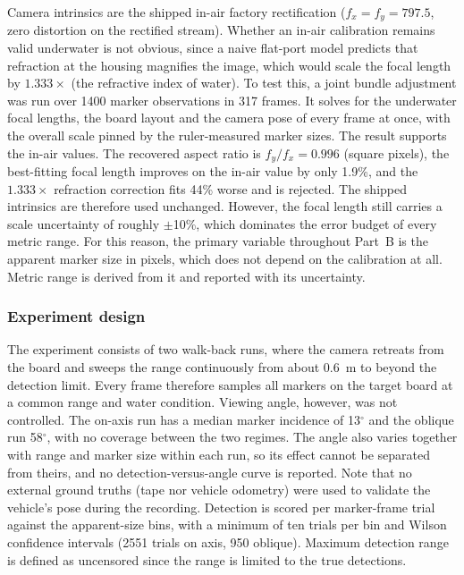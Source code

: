 Camera intrinsics are the shipped in-air factory rectification ($f_x{=}f_y{=}797.5$, zero distortion on the rectified stream). Whether an in-air calibration remains valid underwater is not obvious, since a naive flat-port model predicts that refraction at the housing magnifies the image, which would scale the focal length by $1.333\times$ (the refractive index of water). To test this, a joint bundle adjustment was run over 1400 marker observations in 317 frames. It solves for the underwater focal lengths, the board layout and the camera pose of every frame at once, with the overall scale pinned by the ruler-measured marker sizes. The result supports the in-air values. The recovered aspect ratio is $f_y/f_x = 0.996$ (square pixels), the best-fitting focal length improves on the in-air value by only 1.9\%, and the $1.333\times$ refraction correction fits 44\% worse and is rejected. The shipped intrinsics are therefore used unchanged. However, the focal length still carries a scale uncertainty of roughly $\pm$10\%, which dominates the error budget of every metric range. For this reason, the primary variable throughout Part~B is the apparent marker size in pixels, which does not depend on the calibration at all. Metric range is derived from it and reported with its uncertainty.

\subsubsection{Experiment design}

The experiment consists of two walk-back runs, where the camera retreats from the board and sweeps the range continuously from about 0.6~m to beyond the detection limit. Every frame therefore samples all markers on the target board at a common range and water condition. Viewing angle, however, was not controlled. The on-axis run has a median marker incidence of 13$^\circ$ and the oblique run 58$^\circ$, with no coverage between the two regimes. The angle also varies together with range and marker size within each run, so its effect cannot be separated from theirs, and no detection-versus-angle curve is reported. Note that no external ground truths (tape nor vehicle odometry) were used to validate the vehicle's pose during the recording. Detection is scored per marker-frame trial against the apparent-size bins, with a minimum of ten trials per bin and Wilson confidence intervals (2551 trials on axis, 950 oblique). Maximum detection range is defined as uncensored since the range is limited to the true detections.

